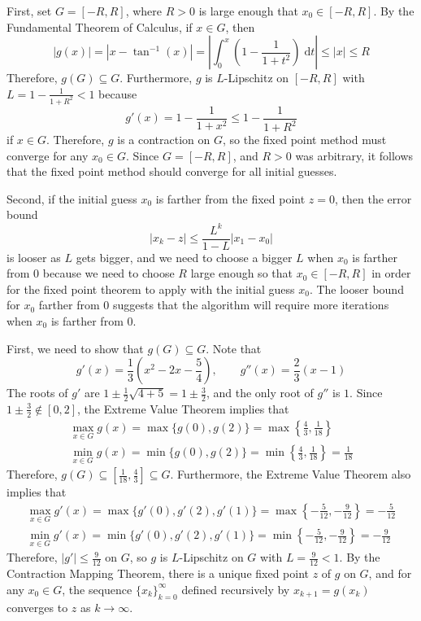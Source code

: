 \documentclass{homework}
\begin{document}
\begin{alphaparts}
	First, set $G = [-R, R]$, where $R > 0$ is large enough that $x_0 \in [-R, R]$. By the Fundamental Theorem of Calculus, if $x \in G$, then
	\begin{equation}
		|g(x)| = \left|x - \tan^{-1}(x)\right| = \left|\int_0^x\left(1 - \frac{1}{1+t^2}\right)\;\text{d}t\right| \le |x| \le R
	\end{equation}
	Therefore, $g(G) \subseteq G$. Furthermore, $g$ is $L$-Lipschitz on $[-R, R]$ with $L = 1 - \frac{1}{1+R^2} < 1$ because
	\begin{equation}
		g'(x) = 1-\frac{1}{1+x^2} \le 1-\frac{1}{1+R^2}
	\end{equation}
	if $x \in G$. Therefore, $g$ is a contraction on $G$, so the fixed point method must converge for any $x_0 \in G$. Since $G = [-R,R]$, and $R > 0$ was arbitrary, it follows that the fixed point method should converge for all initial guesses.
	
	Second, if the initial guess $x_0$ is farther from the fixed point $z=0$, then the error bound
	\begin{equation}
		|x_k - z| \le \frac{L^k}{1-L}|x_1 - x_0|
	\end{equation}
	is looser as $L$ gets bigger, and we need to choose a bigger $L$ when $x_0$ is farther from $0$ because we need to choose $R$ large enough so that $x_0 \in [-R, R]$ in order for the fixed point theorem to apply with the initial guess $x_0$. The looser bound for $x_0$ farther from $0$ suggests that the algorithm will require more iterations when $x_0$ is farther from $0$.
\end{alphaparts}

\question
First, we need to show that $g(G) \subseteq G$. Note that
\begin{equation}
	g'(x) = \frac{1}{3}\left(x^2 - 2x -\frac{5}{4}\right), \qquad g''(x) = \frac{2}{3}(x - 1)
\end{equation}
The roots of $g'$ are $1 \pm \frac{1}{2}\sqrt{4 + 5} = 1 \pm \frac{3}{2}$, and the only root of $g''$ is $1$. Since $1\pm \frac{3}{2} \notin [0,2]$, the Extreme Value Theorem implies that
\begin{gather}
	\max_{x\in G} g(x) = \max\{g(0), g(2)\} = \max\left\{\frac{4}{3}, \frac{1}{18}\right\}\\
	\min_{x\in G} g(x) = \min\{g(0), g(2)\} = \min\left\{\frac{4}{3},\frac{1}{18}\right\} = \frac{1}{18}
\end{gather}
Therefore, $g(G) \subseteq \left[\frac{1}{18},\frac{4}{3}\right]\subseteq G$. Furthermore, the Extreme Value Theorem also implies that
\begin{gather}
	\max_{x\in G} g'(x) = \max\{g'(0), g'(2), g'(1)\} = \max\left\{-\frac{5}{12},-\frac{9}{12}\right\} = -\frac{5}{12} \\
	\min_{x\in G} g'(x) = \min\{g'(0), g'(2), g'(1)\} = \min\left\{-\frac{5}{12},-\frac{9}{12}\right\} = -\frac{9}{12}
\end{gather}
Therefore, $|g'| \le \frac{9}{12}$ on $G$, so $g$ is $L$-Lipschitz on $G$ with $L = \frac{9}{12} < 1$. By the Contraction Mapping Theorem, there is a unique fixed point $z$ of $g$ on $G$, and for any $x_0 \in G$, the sequence $\{x_k\}_{k=0}^\infty$ defined recursively by $x_{k+1} = g(x_k)$ converges to $z$ as $k \to \infty$.
\end{document}
